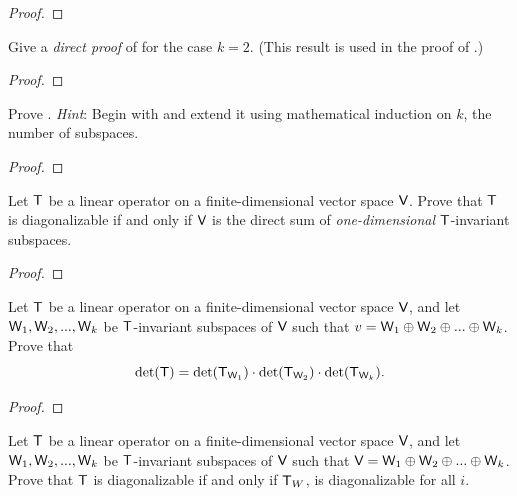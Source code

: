 \begin{proof}
\end{proof}

\begin{exercise} \label{exercise 5.4.33}
Give a \emph{direct proof} of  for the case \(k = 2\).
(This result is used in the proof of .)
\end{exercise}

\begin{proof}
\end{proof}

\begin{exercise} \label{exercise 5.4.34}
Prove .
\emph{Hint}: Begin with  and extend it using mathematical induction on \(k\), the number of subspaces.
\end{exercise}

\begin{proof}
\end{proof}

\begin{exercise} \label{exercise 5.4.35}
Let \(\textsf{T}\) be a linear operator on a finite-dimensional vector space \(\textsf{V}\).
Prove that \(\textsf{T}\) is diagonalizable if and only if \(\textsf{V}\) is the direct sum of \emph{one-dimensional} \(\textsf{T}\)-invariant subspaces.
\end{exercise}

\begin{proof}
\end{proof}

\begin{exercise} \label{exercise 5.4.36}
Let \(\textsf{T}\) be a linear operator on a finite-dimensional vector space \(\textsf{V}\), and let \(\textsf{W}_1, \textsf{W}_2, ..., \textsf{W}_k\) be \(\textsf{T}\)-invariant subspaces of \(\textsf{V}\) such that \(v = \textsf{W}_1 \oplus \textsf{W}_2 \oplus ... \oplus \textsf{W}_k\).
Prove that
\[
    \det(\textsf{T}) = \det(\textsf{T}_{\textsf{W}_1}) \cdot \det(\textsf{T}_{\textsf{W}_2}) \cdot \det(\textsf{T}_{\textsf{W}_k}).
\]
\end{exercise}

\begin{proof}
\end{proof}

\begin{exercise} \label{exercise 5.4.37}
Let \(\textsf{T}\) be a linear operator on a finite-dimensional vector space \(\textsf{V}\), and let \(\textsf{W}_1, \textsf{W}_2, ..., \textsf{W}_k\) be \(\textsf{T}\)-invariant subspaces of \(\textsf{V}\) such that \(\textsf{V} = \textsf{W}_1 \oplus \textsf{W}_2 \oplus ... \oplus \textsf{W}_k\).
Prove that \(\textsf{T}\) is diagonalizable if and only if \(\textsf{T}_W\), is diagonalizable for all \(i\).
\end{exercise}


